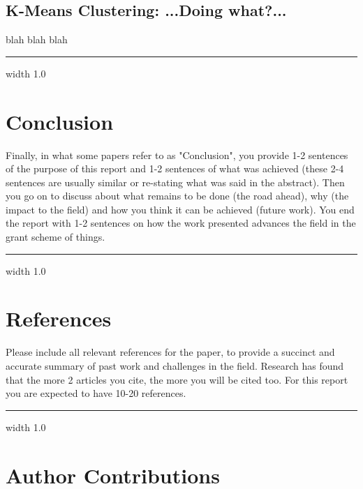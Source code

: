 \documentclass[12pt]{article}
\newcommand{\horizontalLine}{
	\begin{center}
		\hrule width 1.0\textwidth
	\end{center}
}
\begin{document}
\subsection{K-Means Clustering: ...Doing what?...}
\label{subsec:kMeansResults}
blah blah blah

\horizontalLine
\section{Conclusion}
\label{sec:conclusion}
Finally, in what some papers refer to as "Conclusion", you provide 1-2 sentences of the purpose
of this report and 1-2 sentences of what was achieved (these 2-4 sentences are usually similar
or re-stating what was said in the abstract). Then you go on to discuss about what remains to
be done (the road ahead), why (the impact to the field) and how you think it can be achieved
(future work). You end the report with 1-2 sentences on how the work presented advances the
field in the grant scheme of things.

\horizontalLine
\section{References}
\label{sec:references}
 Please include all relevant references for the paper, to provide a succinct and accurate
 summary of past work and challenges in the field. Research has found that the more
 2
 articles you cite, the more you will be cited too. For this report you are expected to have 10-20
 references.

\horizontalLine
\section{Author Contributions}
\label{sec:authorContributions}
\end{document}
